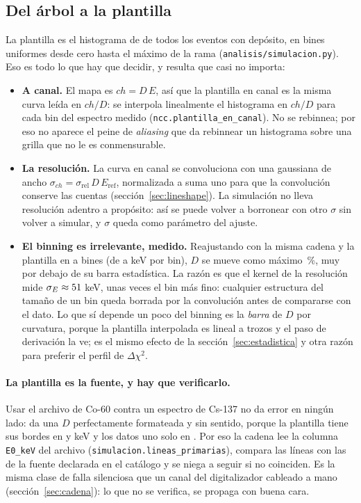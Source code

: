 \documentclass[11pt,a4paper]{article}
\begin{document}
\subsection{Del árbol a la plantilla}

La plantilla es el histograma de \texttt{\Rama} de todos los eventos con
depósito, en \SimBinsPlantilla{} bines uniformes desde cero hasta el máximo de la rama
(\texttt{analisis/simulacion.py}). Eso es todo lo que hay que decidir, y
resulta que casi no importa:

\begin{itemize}
\item \textbf{A canal.} El mapa es $ch = D\,E$, así que la plantilla en canal
      es la misma curva leída en $ch/D$: se interpola linealmente el
      histograma en $ch/D$ para cada bin del espectro medido
      (\texttt{ncc.plantilla\_en\_canal}). No se rebinnea; por eso no aparece
      el peine de \emph{aliasing} que da rebinnear un histograma sobre una
      grilla que no le es conmensurable.
\item \textbf{La resolución.} La curva en canal se convoluciona con una
      gaussiana de ancho $\sigma_{ch} = \sigma_{\text{rel}}\,D\,E_{\text{ref}}$,
      normalizada a suma uno para que la convolución conserve las cuentas
      (sección~\ref{sec:lineshape}). La simulación no lleva resolución
      adentro a propósito: así se puede volver a borronear con otro $\sigma$
      sin volver a simular, y $\sigma$ queda como parámetro del ajuste.
\item \textbf{El binning es irrelevante, medido.} Reajustando \EjCorrida{}
      con la misma cadena y la plantilla en \BinsMin{} a \BinsMax{} bines
      (de \BinsAnchoMax{} a \BinsAnchoMin{} keV por bin), $D$ se mueve como
      máximo \BinsDesvMax\,\%, muy por debajo de su barra estadística. La
      razón es que el kernel de la resolución mide $\sigma_E \approx
      51$ keV, unas \BinsSigmaSobreBin{} veces el bin más fino:
      cualquier estructura del tamaño de un bin queda borrada por la
      convolución antes de compararse con el dato. Lo que sí depende un poco
      del binning es la \emph{barra} de $D$ por curvatura, porque la plantilla
      interpolada es lineal a trozos y el paso de derivación la ve; es el
      mismo efecto de la sección~\ref{sec:estadistica} y otra razón para
      preferir el perfil de $\Delta\chi^2$.
\end{itemize}

\paragraph{La plantilla es la fuente, y hay que verificarlo.} Usar el archivo
de Co-60 contra un espectro de Cs-137 no da error en ningún lado: da una $D$
perfectamente formateada y sin sentido, porque la plantilla tiene sus bordes
en \BordeCoA{} y \BordeCoB{} keV y los datos uno solo en \BordeCs. Por eso la
cadena lee la columna \texttt{E0\_keV} del archivo
(\texttt{simulacion.lineas\_primarias}), compara las líneas con las de la
fuente declarada en el catálogo y se niega a seguir si no coinciden. Es la
misma clase de falla silenciosa que un canal del digitalizador cableado a
mano (sección~\ref{sec:cadena}): lo que no se verifica, se propaga con buena
cara.
\end{document}
